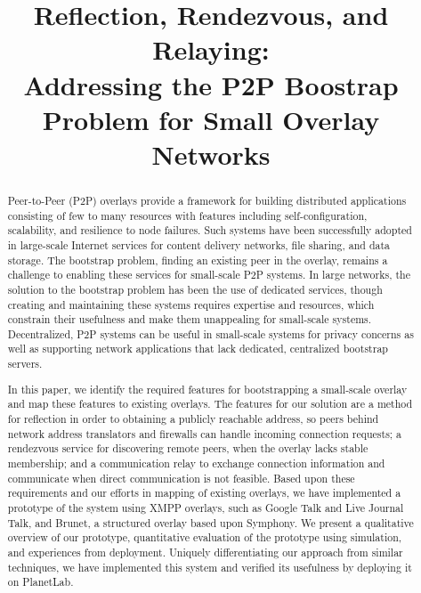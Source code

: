 \documentclass[conference]{IEEEtran}
\begin{document}
\title{Reflection, Rendezvous, and Relaying: \\
Addressing the P2P Boostrap Problem for Small Overlay Networks}

\author{
}

\maketitle

\begin{abstract}

Peer-to-Peer (P2P) overlays provide a framework for building distributed
applications consisting of few to many resources with features including
self-configuration, scalability, and resilience to node failures.  Such systems
have been successfully adopted in large-scale Internet services for content
delivery networks, file sharing, and data storage.  The bootstrap problem,
finding an existing peer in the overlay, remains a challenge to enabling these
services for small-scale P2P systems.  In large networks, the solution to the
bootstrap problem has been the use of dedicated services, though creating and
maintaining these systems requires expertise and resources, which constrain
their usefulness and make them unappealing for small-scale systems.
Decentralized, P2P systems can be useful in small-scale systems for privacy
concerns as well as supporting network applications that lack dedicated,
centralized bootstrap servers.

In this paper, we identify the required features for bootstrapping a
small-scale overlay and map these features to existing overlays.  The features
for our solution are a method for reflection in order to obtaining a publicly
reachable address, so peers behind network address translators and firewalls
can handle incoming connection requests; a rendezvous service for discovering
remote peers, when the overlay lacks stable membership; and a communication
relay to exchange connection information and communicate when direct
communication is not feasible.  Based upon these requirements and our efforts
in mapping of existing overlays, we have implemented a prototype of the system
using XMPP overlays, such as Google Talk and Live Journal Talk, and Brunet, a
structured overlay based upon Symphony.  We present a qualitative overview of
our prototype, quantitative evaluation of the prototype using simulation, and
experiences from deployment.  Uniquely differentiating our approach from
similar techniques, we have implemented this system and verified its usefulness
by deploying it on PlanetLab.

\end{abstract}
\end{document}
